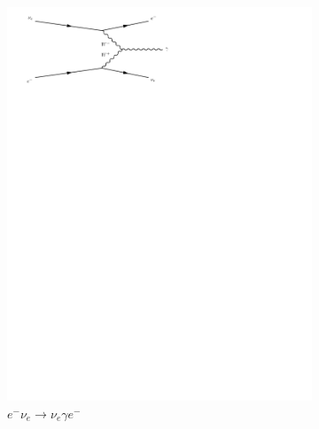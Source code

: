 \begin{figure}[h]
\begin{subfigure}[b]{0.3\textwidth}
    \includegraphics[trim={0.5cm 22cm 10cm 0cm},width=\textwidth]{../Diagrams/D7.pdf}
    \caption{$e^-\nu_e\rightarrow \nu_e \gamma e^-$}
    \label{fey:7}
  \end{subfigure}%
  ~
  \begin{subfigure}[b]{0.3\textwidth}

\end{subfigure}
\end{figure}
